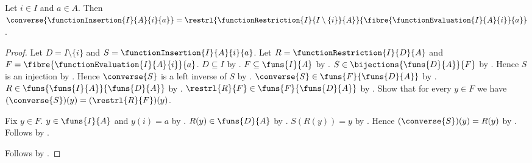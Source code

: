 \begin{theorem}\label{function_insertion_converse}
    Let $i\in I$ and $a\in A$.
    Then $\converse{\functionInsertion{I}{A}{i}{a}}
        =\restrl{\functionRestriction{I}{I\setminus\{i\}}{A}}{
            \fibre{\functionEvaluation{I}{A}{i}}{a}}$.
\end{theorem}
\begin{proof}
    Let $D=I\setminus\{i\}$ and $S=\functionInsertion{I}{A}{i}{a}$.
    Let $R=\functionRestriction{I}{D}{A}$ and $F=\fibre{\functionEvaluation{I}{A}{i}}{a}$.
    $D\subseteq I$ by .
    $F\subseteq\funs{I}{A}$ by .
    $S\in\bijections{\funs{D}{A}}{F}$ by .
    Hence $S$ is an injection by .
    Hence $\converse{S}$ is a left inverse of $S$ by
        .
    $\converse{S}\in\funs{F}{\funs{D}{A}}$ by
        .
    $R\in\funs{\funs{I}{A}}{\funs{D}{A}}$ by .
    $\restrl{R}{F}\in\funs{F}{\funs{D}{A}}$ by .
    Show that for every $y\in F$ we have $(\converse{S})(y)=(\restrl{R}{F})(y)$.
    \begin{subproof}
        Fix $y\in F$.
        $y\in\funs{I}{A}$ and $y(i)=a$ by .
        $R(y)\in\funs{D}{A}$ by .
        $S(R(y))=y$ by .
        Hence $(\converse{S})(y)=R(y)$ by .
        Follows by .
    \end{subproof}
    Follows by .
\end{proof}
